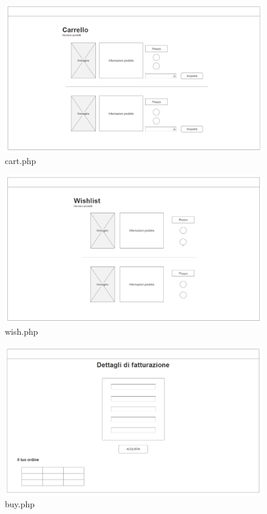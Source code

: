 \documentclass[12pt]{extarticle}
\begin{document}
\begin{figure}
    \includegraphics[width=\linewidth]{mocanu/mockup/Carrello.png}
    \caption{cart.php}
    \label{fig:cart.php}
\end{figure}
\begin{figure}
    \includegraphics[width=\linewidth]{mocanu/mockup/wishlist.png}
    \caption{wish.php}
    \label{fig:wish.php}
\end{figure}
\begin{figure}
    \includegraphics[width=\linewidth]{mocanu/mockup/Buy.png}
    \caption{buy.php}
    \label{fig:buy.php}
\end{figure}
\end{document}
